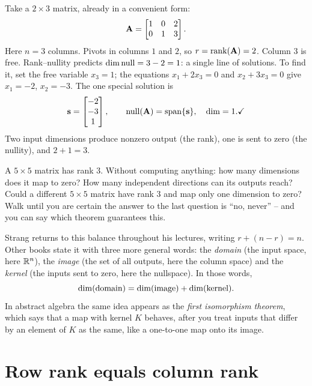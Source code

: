 \begin{example}\label{ch16:rn-example}
Take a $2\times 3$ matrix, already in a convenient form:
\[
  \mathbf{A} = \begin{bmatrix} 1 & 0 & 2 \\ 0 & 1 & 3 \end{bmatrix}.
\]
Here $n = 3$ columns. Pivots in columns $1$ and $2$, so $r = \operatorname{rank}(\mathbf{A}) = 2$.
Column $3$ is free. Rank--nullity predicts $\operatorname{dim}\operatorname{null} = 3 - 2 = 1$: a single
line of solutions. To find it, set the free variable $x_3 = 1$; the equations
$x_1 + 2x_3 = 0$ and $x_2 + 3x_3 = 0$ give $x_1 = -2$, $x_2 = -3$. The one special
solution is
\[
  \mathbf{s} = \begin{bmatrix}-2 \\ -3 \\ 1\end{bmatrix}, \qquad
  \operatorname{null}(\mathbf{A}) = \operatorname{span}\{\mathbf{s}\}, \quad \operatorname{dim} = 1. \checkmark
\]
Two input dimensions produce nonzero output (the rank), one is sent to
zero (the nullity), and $2 + 1 = 3$.
\end{example}

\begin{walkbox}
A $5\times 5$ matrix has rank $3$. Without computing anything: how many dimensions
does it map to zero? How many independent directions can its outputs reach?
Could a different $5\times 5$ matrix have rank $3$ and map only one dimension
to zero? Walk until you are certain the answer to the last question is ``no,
never'' -- and you can say which theorem guarantees this.
\end{walkbox}

\begin{strangbox}
Strang returns to this balance throughout his lectures, writing
$r + (n-r) = n$. Other books state it with three more general words: the
\emph{domain} (the input space, here $\mathbb{R}^n$), the \emph{image} (the set of all
outputs, here the column space) and the \emph{kernel} (the inputs sent to zero,
here the nullspace). In those words,
\[
  \operatorname{dim}(\text{domain}) = \operatorname{dim}(\text{image}) + \operatorname{dim}(\text{kernel}).
\]
In abstract algebra the same idea appears as the \emph{first isomorphism
theorem}, which says that a map with kernel $K$ behaves, after you treat inputs
that differ by an element of $K$ as the same, like a one-to-one map onto its
image.
\end{strangbox}

\section{Row rank equals column rank}

